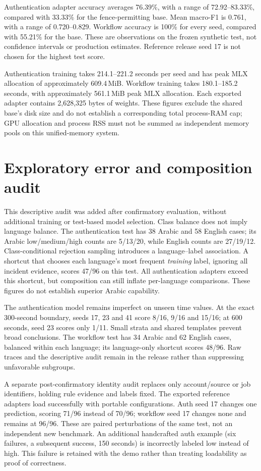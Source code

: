 \documentclass[11pt]{article}
\begin{document}
Authentication adapter accuracy averages 76.39\%, with a range of 72.92--83.33\%, compared with 33.33\% for the fence-permitting base. Mean macro-F1 is 0.761, with a range of 0.720--0.829. Workflow accuracy is 100\% for every seed, compared with 55.21\% for the base. These are observations on the frozen synthetic test, not confidence intervals or production estimates. Reference release seed 17 is not chosen for the highest test score.

Authentication training takes 214.1--221.2 seconds per seed and has peak MLX allocation of approximately 609.4\,MiB. Workflow training takes 180.1--185.2 seconds, with approximately 561.1\,MiB peak MLX allocation. Each exported adapter contains 2,628,325 bytes of weights. These figures exclude the shared base's disk size and do not establish a corresponding total process-RAM cap; GPU allocation and process RSS must not be summed as independent memory pools on this unified-memory system.

\section{Exploratory error and composition audit}
This descriptive audit was added after confirmatory evaluation, without additional training or test-based model selection. Class balance does not imply language balance. The authentication test has 38 Arabic and 58 English cases; its Arabic low/medium/high counts are 5/13/20, while English counts are 27/19/12. Class-conditional rejection sampling introduces a language--label association. A shortcut that chooses each language's most frequent \emph{training} label, ignoring all incident evidence, scores 47/96 on this test. All authentication adapters exceed this shortcut, but composition can still inflate per-language comparisons. These figures do not establish superior Arabic capability.

The authentication model remains imperfect on unseen time values. At the exact 300-second boundary, seeds 17, 23 and 41 score 8/16, 9/16 and 15/16; at 600 seconds, seed 23 scores only 1/11. Small strata and shared templates prevent broad conclusions. The workflow test has 34 Arabic and 62 English cases, balanced within each language; its language-only shortcut scores 48/96. Raw traces and the descriptive audit remain in the release rather than suppressing unfavorable subgroups.

A separate post-confirmatory identity audit replaces only account/source or job identifiers, holding rule evidence and labels fixed. The exported reference adapters load successfully with portable configurations. Auth seed 17 changes one prediction, scoring 71/96 instead of 70/96; workflow seed 17 changes none and remains at 96/96. These are paired perturbations of the same test, not an independent new benchmark. An additional handcrafted auth example (six failures, a subsequent success, 150 seconds) is incorrectly labeled low instead of high. This failure is retained with the demo rather than treating loadability as proof of correctness.
\end{document}
